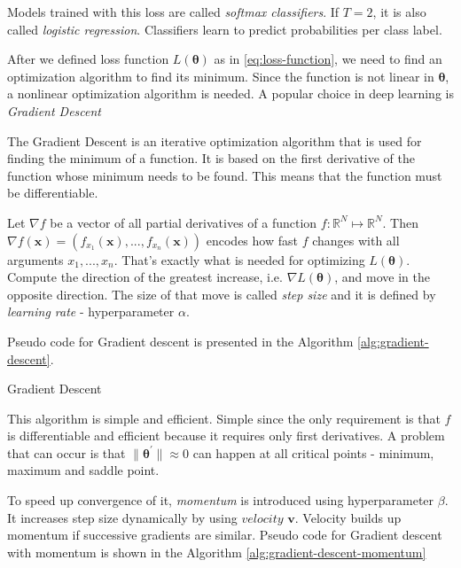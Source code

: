 Models trained with this loss are called \textit{softmax classifiers}. If $T = 2$, it is also called \textit{logistic regression}. Classifiers learn to predict probabilities per class label.

After we defined loss function $L(\pmb \theta)$  as in \ref{eq:loss-function}, we need to find an optimization algorithm to find its minimum. Since the function is not linear in $\pmb \theta$, a nonlinear optimization algorithm is needed. A popular choice in deep learning is \textit{Gradient Descent}

The Gradient Descent is an iterative optimization algorithm that is used for finding the minimum of a function. It is based on the first derivative of the function whose minimum needs to be found. This means that the function must be differentiable. 

Let $\nabla f$ be a vector of all partial derivatives of a function $f: \mathbb{R}^N \mapsto \mathbb{R}^N$. Then $\nabla f(\pmb x) = (f_{x_1}(\pmb x), ..., f_{x_n}(\pmb x))$  encodes how fast $f$ changes with all arguments $x_1, ..., x_n$. That's exactly what is needed for optimizing $L(\pmb \theta)$. Compute the direction of the greatest increase, i.e. $\nabla L(\pmb \theta)$, and move in the opposite direction. The size of that move is called \textit{step size} and it is defined by \textit{learning rate} - hyperparameter $\alpha$.  

Pseudo code for Gradient descent is presented in the Algorithm \ref{alg:gradient-descent}.

\begin{algorithm}[htb]
\caption{Gradient Descent}
\label{alg:gradient-descent}


\end{algorithm}

This algorithm is simple and efficient. Simple since the only requirement is that $f$ is differentiable and efficient because it requires only first derivatives. A problem that can occur is that $\| \pmb \theta^{'}\|  \approx 0$ can happen at all critical points - minimum, maximum and saddle point.

To speed up convergence of it, \textit{momentum} is introduced using hyperparameter $\beta$. It increases step size dynamically by using $velocity$ $\pmb v$. Velocity builds up momentum if successive gradients are similar. Pseudo code for Gradient descent with momentum is shown in the Algorithm \ref{alg:gradient-descent-momentum}

